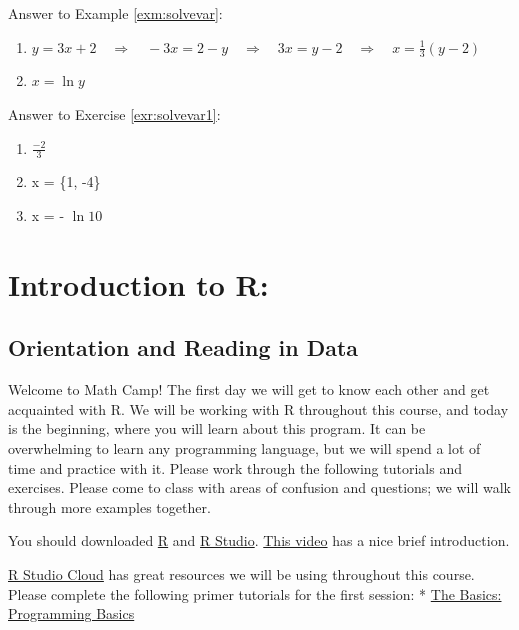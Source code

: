 \documentclass[
]{book}
\theoremstyle{definition}
\theoremstyle{definition}
\theoremstyle{definition}
\theoremstyle{definition}
\theoremstyle{remark}
\begin{document}
Answer to Example \ref{exm:solvevar}:

\begin{enumerate}
\def\labelenumi{\arabic{enumi}.}
\item
  \(y=3x+2 \quad\Longrightarrow\quad -3x=2-y \quad\Longrightarrow\quad 3x=y-2 \quad\Longrightarrow\quad x=\frac{1}{3}(y-2)\)
\item
  \(x = \ln{y}\)
\end{enumerate}

Answer to Exercise \ref{exr:solvevar1}:

\begin{enumerate}
\def\labelenumi{\arabic{enumi}.}
\item
  \(\frac{-2}{3}\)
\item
  x = \{1, -4\}
\item
  x = - \(\ln10\)
\end{enumerate}

\hypertarget{part-introduction-to-r}{%
\part{Introduction to R:}\label{part-introduction-to-r}}

\hypertarget{orientation-and-reading-in-data}{%
\chapter{Orientation and Reading in Data}\label{orientation-and-reading-in-data}}

Welcome to Math Camp! The first day we will get to know each other and get acquainted with R. We will be working with R throughout this course, and today is the beginning, where you will learn about this program. It can be overwhelming to learn any programming language, but we will spend a lot of time and practice with it. Please work through the following tutorials and exercises. Please come to class with areas of confusion and questions; we will walk through more examples together.

You should downloaded \href{https://cran.r-project.org/}{R} and \href{https://www.rstudio.com/products/rstudio/}{R Studio}. \href{https://www.youtube.com/watch?v=iffR3fWv4xw\&list=PLOU2XLYxmsIK9qQfztXeybpHvru-TrqAP\&index=3}{This video} has a nice brief introduction.

\href{https://rstudio.cloud/learn/primers/}{R Studio Cloud} has great resources we will be using throughout this course. Please complete the following primer tutorials for the first session:
* \href{https://rstudio.cloud/learn/primers/1.2}{The Basics: Programming Basics}
\end{document}
